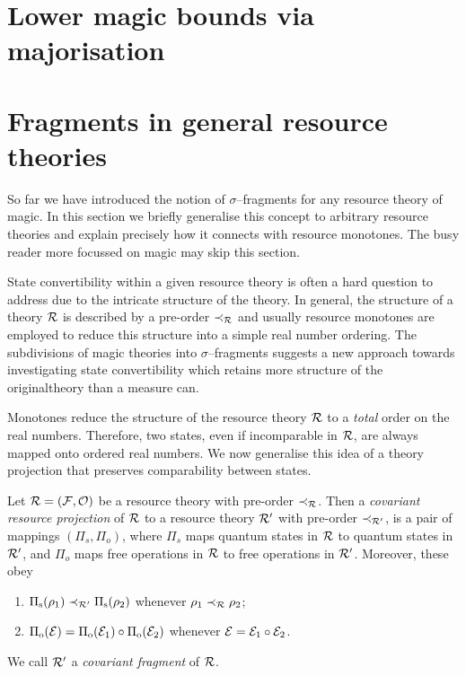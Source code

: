 \documentclass[pra,
aps,
twocolumn,
superscriptaddress,
groupedaddress,
nofootinbib,
reprint
]{revtex4-1}
\begin{document}

\section{Lower magic bounds via majorisation}
\label{sec:lower_bounds}



\section{Fragments in general resource theories}
\label{sec:general_resources}


So far we have introduced the notion of $\sigma$--fragments for any resource theory of magic. 
In this section we briefly generalise this concept to arbitrary resource theories and explain precisely how it connects with resource monotones. 
The busy reader more focussed on magic may skip this section.

State convertibility within a given resource theory is often a hard question to address due to the intricate structure of the theory.
In general, the structure of a theory $\mathcal{R}$ is described by a pre-order $\prec_{\mathcal{R}}$ and usually resource monotones are employed to reduce this structure into a simple real number ordering.
The subdivisions of magic theories into $\sigma$--fragments suggests a new approach towards investigating state convertibility which retains more structure of the originaltheory than a measure can.

Monotones reduce the structure of the resource theory $\mathcal{R}$ to a \emph{total} order on the real numbers.
Therefore, two states, even if incomparable in $\mathcal{R}$, are always mapped onto ordered real numbers.
We now generalise this idea of a theory projection that preserves comparability between states. 
\begin{definition}\label{def:covproj}
Let $\mathcal{R} = (\mathcal{F}, \mathcal{O})$ be a resource theory with pre-order $\prec_{\mathcal{R}}$. 
Then a \emph{covariant resource projection} of $\mathcal{R}$ to a resource theory $\mathcal{R}'$ with pre-order $\prec_{\mathcal{R}'}$, is a pair of mappings $(\Pi_s, \Pi_o)$, where $\Pi_s$ maps quantum states in $\mathcal{R}$ to quantum states in $\mathcal{R}'$, and $\Pi_o$ maps free operations in $\mathcal{R}$ to free operations in $\mathcal{R}'$. 
Moreover, these obey
	\begin{enumerate}
        \item $\Pi_{\rm{s}}(\rho_1) \prec_{\mathcal{R}'} \Pi_{\rm{s}}(\rho_2)$ whenever $\rho_1 \prec_{\mathcal{R}} \rho_2$;
        \item $\Pi_{\rm{o}}(\mathcal{E}) = \Pi_{\rm{o}}(\mathcal{E}_1) \circ \Pi_{\rm{o}}(\mathcal{E}_2)$ whenever $\mathcal{E} = \mathcal{E}_1 \circ \mathcal{E}_2$.
    \end{enumerate}
We call $\mathcal{R}'$ a \emph{covariant fragment} of $\mathcal{R}$.
\end{definition}
\end{document}
